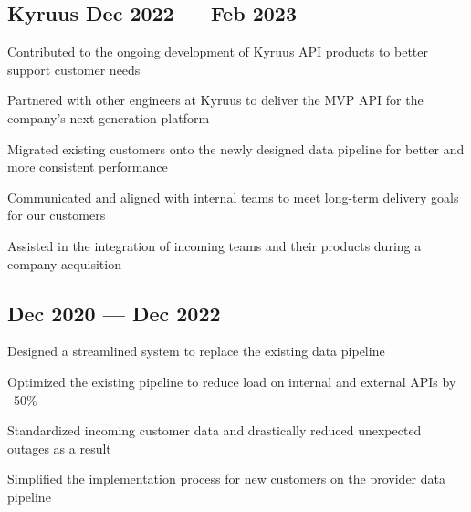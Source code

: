 

\subsection{{Kyruus \hfill Dec 2022 --- Feb 2023}}
\begin{zitemize}
\item Contributed to the ongoing development of Kyruus API products to better support customer needs
\item Partnered with other engineers at Kyruus to deliver the MVP API for the company's next generation platform
\item Migrated existing customers onto the newly designed data pipeline for better and more consistent performance
\item Communicated and aligned with internal teams to meet long-term delivery goals for our customers
\item Assisted in the integration of incoming teams and their products during a company acquisition
\end{zitemize}

\subsection{{\hfill Dec 2020 --- Dec 2022}}
\begin{zitemize}
\item Designed a streamlined system to replace the existing data pipeline
\item Optimized the existing pipeline to reduce load on internal and external APIs by ~50\%
\item Standardized incoming customer data and drastically reduced unexpected outages as a result
\item Simplified the implementation process for new customers on the provider data pipeline
\end{zitemize}

